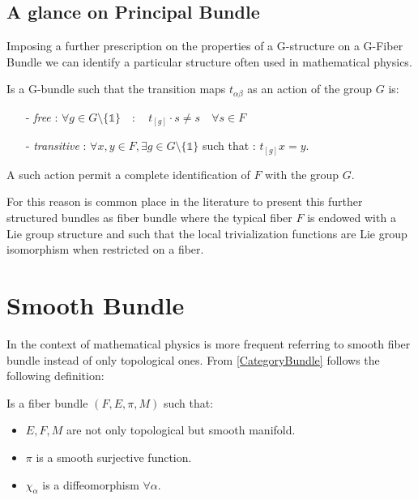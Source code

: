 \documentclass[a4paper,12pt]{scrartcl}    %
\begin{document}
\subsection{A glance on Principal Bundle}
Imposing a further prescription on the properties of a G-structure  on a G-Fiber Bundle we can identify a particular structure often used in mathematical physics.

\begin{definition}
Is a G-bundle such that the transition maps $t_{\alpha \beta}$ as an action of the group $G$ is:
\begin{itemize}
\item[-] \emph{free} : $ \forall g \in G\setminus \{\mathds{1} \} \quad : \quad t_{[g]} \cdot s \neq s \quad \forall s \in F$
\item[-] \emph{transitive} : $\forall x,y \in F , \exists g \in G \setminus \{\mathds{1} \}$ such that : $ t_{[g]} x = y$.
\end{itemize}
\end{definition}

\begin{observation}
A such action permit a complete identification of $F$ with the group $G$.

For this reason is common place in the literature to present this further structured bundles as fiber bundle where the typical fiber $F$ is endowed with a Lie group structure and such that the local trivialization functions are Lie group isomorphism when restricted on a fiber.
\end{observation}




\newpage
\section{Smooth Bundle}
In the context of mathematical physics is more frequent referring to smooth fiber bundle instead of only topological ones.
From \ref{CategoryBundle} follows the following definition:

\begin{definition}
Is  a fiber bundle $(F,E, \pi, M )$ such that:
\begin{itemize}
\item $E,F,M$ are not only topological but smooth manifold.
\item $\pi$ is a smooth surjective function.
\item $\chi_{\alpha} $ is a diffeomorphism $\forall \alpha$.
\end{itemize}
\end{definition}
\end{document}
